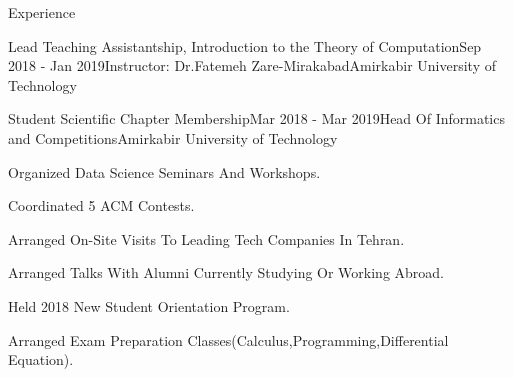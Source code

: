 \documentclass{resume} %
\begin{document}
\begin{rSection}{Experience}
\begin{rSubsection}{Lead Teaching Assistantship, Introduction to the Theory of Computation}{Sep 2018 - Jan 2019}{Instructor: Dr.Fatemeh Zare-Mirakabad}{Amirkabir University of Technology}
		\end{rSubsection}
		
		
		\begin{rSubsection}{Student Scientific Chapter Membership}{Mar 2018 - Mar  2019}{Head Of Informatics and Competitions}{Amirkabir University of Technology}
			\item Organized Data Science Seminars And Workshops.
			\item Coordinated 5 ACM Contests.
			\item Arranged On-Site Visits To Leading Tech Companies In Tehran.
			\item Arranged Talks With Alumni Currently Studying Or Working Abroad.
			\item Held 2018 New Student Orientation Program.
			\item Arranged Exam Preparation Classes(Calculus,Programming,Differential Equation).
		\end{rSubsection}
		
		
	\end{rSection}
	
	
\end{document}
